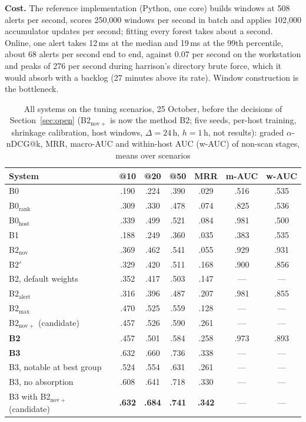 \documentclass[conference]{IEEEtran}
\begin{document}
\textbf{Cost.} The reference implementation (Python, one core) builds windows at 508 alerts per second, scores 250{,}000 windows per second in batch and applies 102{,}000 accumulator updates per second; fitting every forest takes about a second. Online, one alert takes 12\,ms at the median and 19\,ms at the 99th percentile, about 68 alerts per second end to end, against 0.07 per second on the workstation and peaks of 276 per second during harrison's directory brute force, which it would absorb with a backlog (27 minutes above its rate). Window construction is the bottleneck.

\begin{table}[t]
\caption{All systems on the tuning scenarios, 25 October, before the decisions of Section~\ref{sec:open} (B2$_\mathrm{nov+}$ is now the method B2; five seeds, per-host training, shrinkage calibration, host windows, $\Delta = 24$\,h, $h = 1$\,h, not results): graded $\alpha$-nDCG@k, MRR, macro-AUC and within-host AUC (w-AUC) of non-scan stages, means over scenarios}
\label{tab:tuneall}
\centering\footnotesize
\setlength{\tabcolsep}{3pt}
\begin{tabular}{@{}l cccccc@{}}
\toprule
\textbf{System} & \textbf{@10} & \textbf{@20} & \textbf{@50} & \textbf{MRR} & \textbf{m-AUC} & \textbf{w-AUC} \\
\midrule
B0 & .190 & .224 & .390 & .029 & .516 & .535 \\
B0$_\mathrm{rank}$ & .309 & .330 & .478 & .074 & .825 & .536 \\
B0$_\mathrm{host}$ & .339 & .499 & .521 & .084 & .981 & .500 \\
B1 & .188 & .249 & .360 & .035 & .383 & .535 \\
B2$_\mathrm{nov}$ & .369 & .462 & .541 & .055 & .929 & .931 \\
B2$'$ & .329 & .420 & .511 & .168 & .900 & .856 \\
B2, default weights & .352 & .417 & .503 & .147 & --- & --- \\
B2$_\mathrm{alert}$ & .316 & .396 & .487 & .207 & .981 & .855 \\
B2$_\mathrm{max}$ & .470 & .525 & .559 & .128 & --- & --- \\
B2$_\mathrm{nov+}$ (candidate) & .457 & .526 & .590 & .261 & --- & --- \\
\textbf{B2} & .457 & .501 & .584 & .258 & .973 & .893 \\
\textbf{B3} & .632 & .660 & .736 & .338 & --- & --- \\
B3, notable at best group & .524 & .554 & .631 & .261 & --- & --- \\
B3, no absorption & .608 & .641 & .718 & .330 & --- & --- \\
B3 with B2$_\mathrm{nov+}$ (candidate) & \textbf{.632} & \textbf{.684} & \textbf{.741} & \textbf{.342} & --- & --- \\
\bottomrule
\end{tabular}
\end{table}
\end{document}
